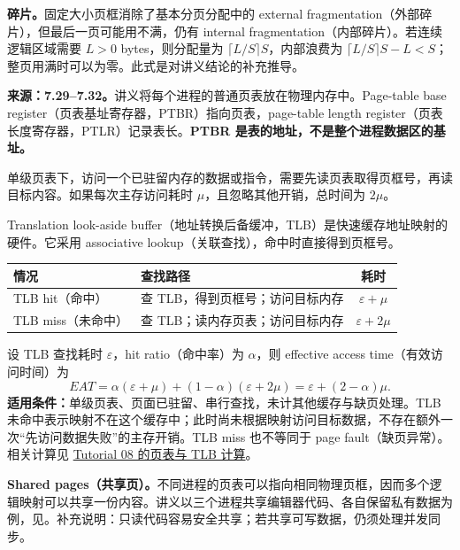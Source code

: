 \textbf{碎片。}固定大小页框消除了基本分页分配中的 external fragmentation（外部碎片），但最后一页可能用不满，仍有 internal fragmentation（内部碎片）。若连续逻辑区域需要 $L>0$ bytes，则分配量为 $\lceil L/S\rceil S$，内部浪费为 $\lceil L/S\rceil S-L<S$；整页用满时可以为零。此式是对讲义结论的补充推导。


\textbf{来源：7.29--7.32。}讲义将每个进程的普通页表放在物理内存中。Page-table base register（页表基址寄存器，PTBR）指向页表，page-table length register（页表长度寄存器，PTLR）记录表长。\textbf{PTBR 是表的地址，不是整个进程数据区的基址。}

单级页表下，访问一个已驻留内存的数据或指令，需要先读页表取得页框号，再读目标内容。如果每次主存访问耗时 $\mu$，且忽略其他开销，总时间为 $2\mu$。

Translation look-aside buffer（地址转换后备缓冲，TLB）是快速缓存地址映射的硬件。它采用 associative lookup（关联查找），命中时直接得到页框号。
\begin{center}
\begin{tabularx}{\textwidth}{@{}l>{\raggedright\arraybackslash}Xc@{}}
\toprule
情况 & 查找路径 & 耗时 \\
\midrule
TLB hit（命中） & 查 TLB，得到页框号；访问目标内存 & $\varepsilon+\mu$ \\
TLB miss（未命中） & 查 TLB；读内存页表；访问目标内存 & $\varepsilon+2\mu$ \\
\bottomrule
\end{tabularx}
\end{center}
设 TLB 查找耗时 $\varepsilon$，hit ratio（命中率）为 $\alpha$，则 effective access time（有效访问时间）为
\[
 \boxed{EAT=\alpha(\varepsilon+\mu)+(1-\alpha)(\varepsilon+2\mu)
             =\varepsilon+(2-\alpha)\mu}.
\]
\textbf{适用条件：}单级页表、页面已驻留、串行查找，未计其他缓存与缺页处理。TLB 未命中表示映射不在这个缓存中；此时尚未根据映射访问目标数据，不存在额外一次“先访问数据失败”的主存开销。TLB miss 也不等同于 page fault（缺页异常）。相关计算见 \hyperref[exercise:SC2005-TUT08-Q03]{Tutorial 08 的页表与 TLB 计算}。

\textbf{Shared pages（共享页）。}不同进程的页表可以指向相同物理页框，因而多个逻辑映射可以共享一份内容。讲义以三个进程共享编辑器代码、各自保留私有数据为例，见。补充说明：只读代码容易安全共享；若共享可写数据，仍须处理并发同步。


